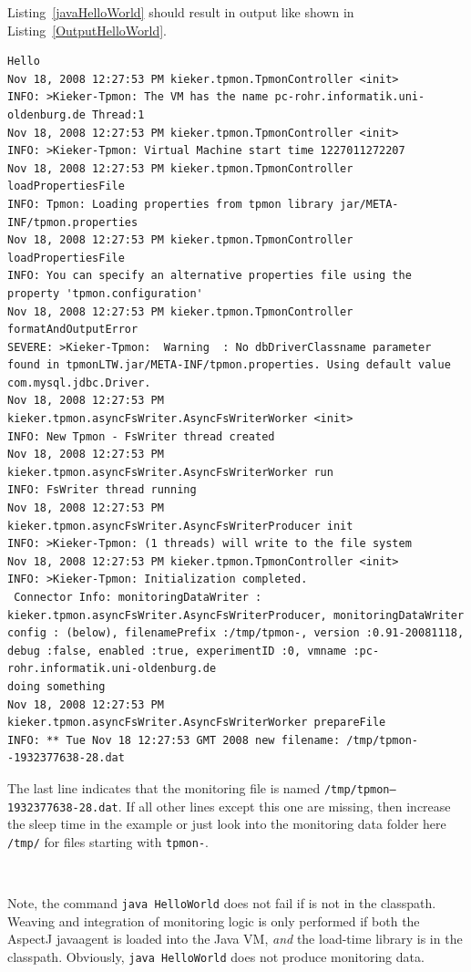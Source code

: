 \documentclass[a4paper,12pt]{scrartcl}
\begin{document}
Listing~\ref{javaHelloWorld} should result in output like shown in Listing~\ref{OutputHelloWorld}.
\begin{lstlisting}[caption={Compilation and execution with AspectJ's Java agent.},label={OutputHelloWorld},language=clean,basicstyle=\ttfamily\footnotesize,keywordstyle=\ttfamily\footnotesize]
Hello
Nov 18, 2008 12:27:53 PM kieker.tpmon.TpmonController <init>
INFO: >Kieker-Tpmon: The VM has the name pc-rohr.informatik.uni-oldenburg.de Thread:1
Nov 18, 2008 12:27:53 PM kieker.tpmon.TpmonController <init>
INFO: >Kieker-Tpmon: Virtual Machine start time 1227011272207
Nov 18, 2008 12:27:53 PM kieker.tpmon.TpmonController loadPropertiesFile
INFO: Tpmon: Loading properties from tpmon library jar/META-INF/tpmon.properties
Nov 18, 2008 12:27:53 PM kieker.tpmon.TpmonController loadPropertiesFile
INFO: You can specify an alternative properties file using the property 'tpmon.configuration'
Nov 18, 2008 12:27:53 PM kieker.tpmon.TpmonController formatAndOutputError
SEVERE: >Kieker-Tpmon:  Warning  : No dbDriverClassname parameter found in tpmonLTW.jar/META-INF/tpmon.properties. Using default value com.mysql.jdbc.Driver.
Nov 18, 2008 12:27:53 PM kieker.tpmon.asyncFsWriter.AsyncFsWriterWorker <init>
INFO: New Tpmon - FsWriter thread created
Nov 18, 2008 12:27:53 PM kieker.tpmon.asyncFsWriter.AsyncFsWriterWorker run
INFO: FsWriter thread running
Nov 18, 2008 12:27:53 PM kieker.tpmon.asyncFsWriter.AsyncFsWriterProducer init
INFO: >Kieker-Tpmon: (1 threads) will write to the file system
Nov 18, 2008 12:27:53 PM kieker.tpmon.TpmonController <init>
INFO: >Kieker-Tpmon: Initialization completed.
 Connector Info: monitoringDataWriter : kieker.tpmon.asyncFsWriter.AsyncFsWriterProducer, monitoringDataWriter config : (below), filenamePrefix :/tmp/tpmon-, version :0.91-20081118, debug :false, enabled :true, experimentID :0, vmname :pc-rohr.informatik.uni-oldenburg.de
doing something
Nov 18, 2008 12:27:53 PM kieker.tpmon.asyncFsWriter.AsyncFsWriterWorker prepareFile
INFO: ** Tue Nov 18 12:27:53 GMT 2008 new filename: /tmp/tpmon--1932377638-28.dat
\end{lstlisting}
The last line indicates that the monitoring file is named \texttt{\small /tmp/tpmon--1932377638-28.dat}. If all other lines except this one are missing, then increase the sleep time in the example or just look into the monitoring data folder here \texttt{/tmp/} for files starting with \texttt{tpmon-}.

\

Note, the command \texttt{java  HelloWorld} does not fail if \tpmon{} is not in the classpath. Weaving and integration of monitoring logic is only performed if both the AspectJ javaagent is loaded into the Java VM, \textit{and} the \tpmon{} load-time library is in the classpath. Obviously, \texttt{java  HelloWorld} does not produce monitoring data.
\end{document}
